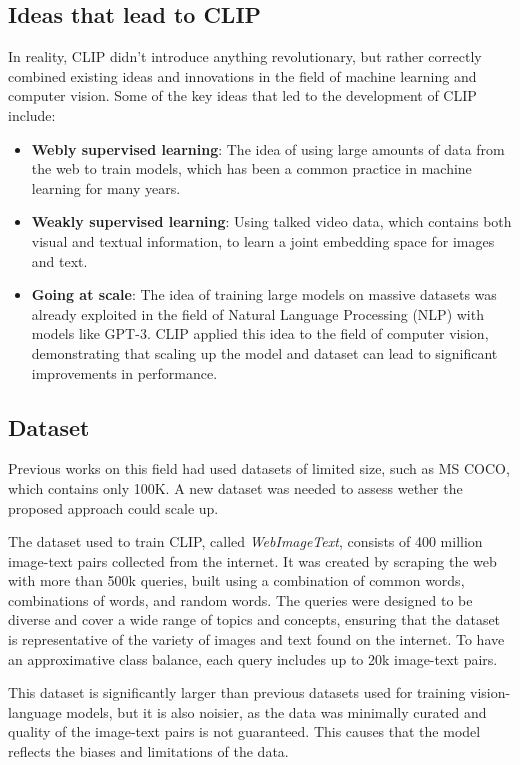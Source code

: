 \subsection{Ideas that lead to CLIP}
In reality, CLIP didn't introduce anything revolutionary, but rather correctly combined existing ideas and innovations in the field of machine learning and computer vision. 
Some of the key ideas that led to the development of CLIP include:
\begin{itemize}
    \item \textbf{Webly supervised learning}: The idea of using large amounts of data from the web to train models, which has been a common practice in machine learning for many years.
    \item \textbf{Weakly supervised learning}: Using talked video data, which contains both visual and textual information, to learn a joint embedding space for images and text.
    \item \textbf{Going at scale}: The idea of training large models on massive datasets was already exploited in the field of Natural Language Processing (NLP) with models like GPT-3.
    CLIP applied this idea to the field of computer vision, demonstrating that scaling up the model and dataset can lead to significant improvements in performance.
\end{itemize}

\subsection{Dataset}
Previous works on this field had used datasets of limited size, such as MS COCO, which contains only 100K. 
A new dataset was needed to assess wether the proposed approach could scale up.

The dataset used to train CLIP, called \textit{WebImageText}, consists of 400 million image-text pairs collected from the internet.
It was created by scraping the web with more than 500k queries, built using a combination of common words, combinations of words, and random words. 
The queries were designed to be diverse and cover a wide range of topics and concepts, ensuring that the dataset is representative of the variety of images and text found on the internet.
To have an approximative class balance, each query includes up to 20k image-text pairs.

This dataset is significantly larger than previous datasets used for training vision-language models, but it is also noisier, 
as the data was minimally curated and quality of the image-text pairs is not guaranteed. 
This causes that the model reflects the biases and limitations of the data.

